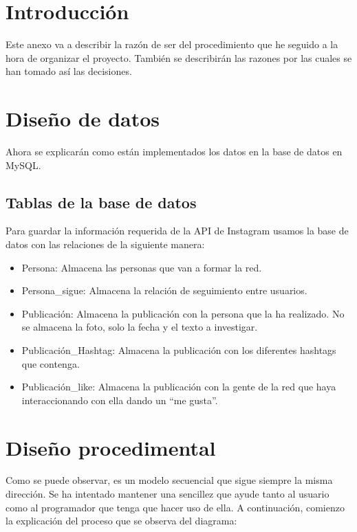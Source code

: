 
\section{Introducción}
Este anexo va a describir la razón de ser del procedimiento que he seguido a la hora de organizar el proyecto. También se describirán las razones por las cuales se han tomado así las decisiones.
\section{Diseño de datos}
Ahora se explicarán como están implementados los datos en la base de datos en MySQL.
\subsection{Tablas de la base de datos}
Para guardar la información requerida de la API de Instagram usamos la base de datos con las relaciones de la siguiente manera:



\begin{itemize}
    \item Persona: Almacena las personas que van a formar la red.
    \item Persona\_sigue: Almacena la relación de seguimiento entre usuarios.
    \item Publicación: Almacena la publicación con la persona que la ha realizado. No se almacena la foto, solo la fecha y el texto a investigar.
    \item Publicación\_Hashtag: Almacena la publicación con los diferentes hashtags que contenga.
    \item Publicación\_like: Almacena la publicación con la gente de la red que haya interaccionando con ella dando un “me gusta”.
\end{itemize}


\section{Diseño procedimental}
Como se puede observar, es un modelo secuencial que sigue siempre la misma dirección. Se ha intentado mantener una sencillez que ayude tanto al usuario como al programador que tenga que hacer uso de ella.
A continuación, comienzo la explicación del proceso que se observa del diagrama:


